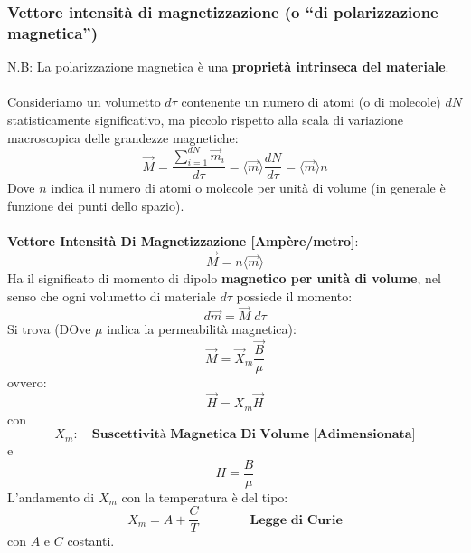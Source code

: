 \documentclass[../main.tex]{subfiles}
\begin{document}
	\subsubsection{Vettore intensità di magnetizzazione (o “di polarizzazione magnetica”)}
	N.B: La polarizzazione magnetica è una \textbf{proprietà intrinseca del materiale}.\\\\
	Consideriamo un volumetto $d\tau$ contenente un numero di atomi (o di molecole) $dN$ statisticamente significativo, ma piccolo rispetto alla scala di variazione macroscopica delle grandezze magnetiche:
	$$\vec{M} = \frac{\sum_{i=1}^{dN} \vec{m}_i}{d\tau} = \langle \vec{m} \rangle \frac{dN}{d\tau} = \langle \vec{m} \rangle n$$
	Dove $n$ indica il numero di atomi o molecole per unità di volume (in generale è funzione dei punti dello spazio).\\\\
	\textbf{Vettore Intensità Di Magnetizzazione [Ampère/metro]}:
	$$\boxed{\vec{M} = n \langle \vec{m} \rangle}$$
	Ha il significato di momento di dipolo \textbf{magnetico per unità di volume}, nel senso che ogni volumetto di materiale $d\tau$ possiede il momento: 
	$$d\vec{m} = \vec{M} \; d\tau$$
	Si trova (DOve $\mu$ indica la permeabilità magnetica):
	$$\boxed{\vec{M} = \vec{X}_m \frac{\vec{B}}{\mu}}$$
	ovvero:
	$$\boxed{\vec{H} = X_m \vec{H}}$$
	con
	$$X_m: \quad \textbf{Suscettività Magnetica Di Volume [Adimensionata]}$$
	e
	$$H = \frac{B}{\mu}$$
	L’andamento di $X_m$ con la temperatura è del tipo:
	$$\boxed{X_m = A + \frac{C}{T}} \qquad \qquad \textbf{Legge di Curie}$$
	con $A$ e $C$ costanti.
\end{document}
